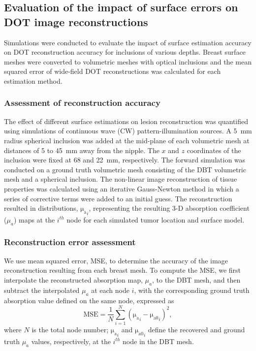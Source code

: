 \subsection{Evaluation of the impact of surface errors on DOT image reconstructions}
Simulations were conducted to evaluate the impact of surface estimation accuracy on DOT reconstruction accuracy for inclusions of various depths. Breast surface meshes were converted to volumetric meshes with optical inclusions and the mean squared error of wide-field DOT reconstructions was calculated for each estimation method. 

\subsubsection{Assessment of reconstruction accuracy}
The effect of different surface estimations on lesion reconstruction was quantified using simulations of continuous wave (CW) pattern-illumination sources. A 5~mm radius spherical inclusion was added at the mid-plane of each volumetric mesh at distances of 5 to 45~mm away from the nipple. The $x$ and $z$ coordinates of the inclusion were fixed at 68 and 22~mm, respectively. The forward simulation was conducted on a ground truth volumetric mesh consisting of the DBT volumetric mesh and a spherical inclusion. The non-linear image reconstruction of tissue properties was calculated using an iterative Gauss-Newton method in which a series of corrective terms were added to an initial guess. The reconstruction resulted in distributions, $\mathrm{\mu_{a}}_{i}$, representing the resulting 3-D absorption coefficient ($\mu_a$) maps at the $i^{th}$ node for each simulated tumor location and surface model.

\subsubsection{Reconstruction error assessment}
We use mean squared error, MSE, to determine the accuracy of the image reconstruction resulting from each breast mesh. To compute the MSE, we first interpolate the reconstructed absorption map, $\mu_a$, to the DBT mesh, and then subtract the interpolated $\mu_a$ at each node $i$, with the corresponding ground truth absorption value defined on the same node, expressed as
\begin{equation}
\label{eq:mse}
\mathrm{MSE} = \frac{1}{N}\sum_{i=1}^{N}(\mathrm{\mu_{a}}_{i} - \mathrm{\mu_{a0}}_i)^{2},
\end{equation}
where $N$ is the total node number; $\mathrm{\mu_{a}}_i$ and $\mathrm{\mu_{a0}}_i$ define the recovered and ground truth $\mu_{a}$ values, respectively, at the $i^{th}$ node in the DBT mesh.


